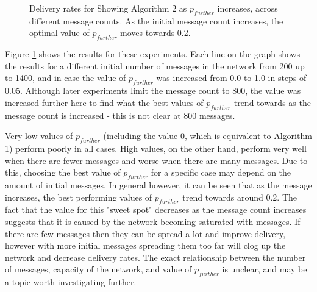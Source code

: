 \documentclass[bsc,frontabs,twoside,singlespacing,parskip,deptreport]{infthesis}     %
\begin{document}
\begin{figure}
\caption{Delivery rates for Showing Algorithm 2 as $p_{further}$ increases, across different message counts. As the initial message count increases, the optimal value of $p_{further}$ moves towards 0.2.}
\label{fig:not_closer_prob}
\end{figure}

Figure \ref{fig:not_closer_prob} shows the results for these experiments. Each line on the graph shows the results for a different initial number of messages in the network from 200 up to 1400, and in case the value of $p_{further}$ was increased from 0.0 to 1.0 in steps of 0.05. Although later experiments limit the message count to 800, the value was increased further here to find what the best values of $p_{further}$ trend towards as the message count is increased - this is not clear at 800 messages.

Very low values of $p_{further}$ (including the value 0, which is equivalent to Algorithm 1) perform poorly in all cases. High values, on the other hand, perform very well when there are fewer messages and worse when there are many messages. Due to this, choosing the best value of $p_{further}$ for a specific case may depend on the amount of initial messages. In general however, it can be seen that as the message increases, the best performing values of $p_{further}$ trend towards around 0.2. The fact that the value for this "sweet spot" decreases as the message count increases suggests that it is caused by the network becoming saturated with messages. If there are few messages then they can be spread a lot and improve delivery, however with more initial messages spreading them too far will clog up the network and decrease delivery rates. The exact relationship between the number of messages, capacity of the network, and value of $p_{further}$ is unclear, and may be a topic worth investigating further.
\end{document}
